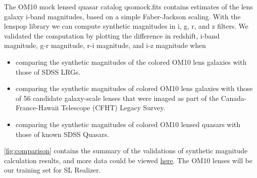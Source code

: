 \documentclass[\docopts]{\docclass}
\begin{document}
The OM10 mock lensed quasar catalog qso\textunderscore mock.fits contains estimates of the lens galaxy i-band magnitudes, based on a simple Faber-Jackson scaling. With the lenspop library we can compute synthetic magnitudes in i, g, r, and z filters. We validated the computation by plotting the difference in redshift,  i-band magnitude, g-r magnitude, r-i magnitude, and i-z magnitude when

\begin{itemize}
  \item comparing the synthetic magnitudes of the colored OM10 lens galaxies with those of SDSS LRGs.
  \item comparing the synthetic magnitudes of colored OM10 lens galaxies with those of 56 candidate galaxy-scale lenses that were imaged as part of the Canada-France-Hawaii Telescope (CFHT) Legacy Survey.
  \item comparing the synthetic magnitudes of colored OM10 lensed quasars with those of known SDSS Quasars.
\end{itemize}

 \ref{fig:comparison} contains the summary of the validations of synthetic magnitude calculation results, and more data could be viewed  \href{https://github.com/drphilmarshall/OM10/blob/master/notebooks/Color%20Comparison.ipynb}{here}. The OM10 lenses will be our training set for SL Realizer.
\end{document}
